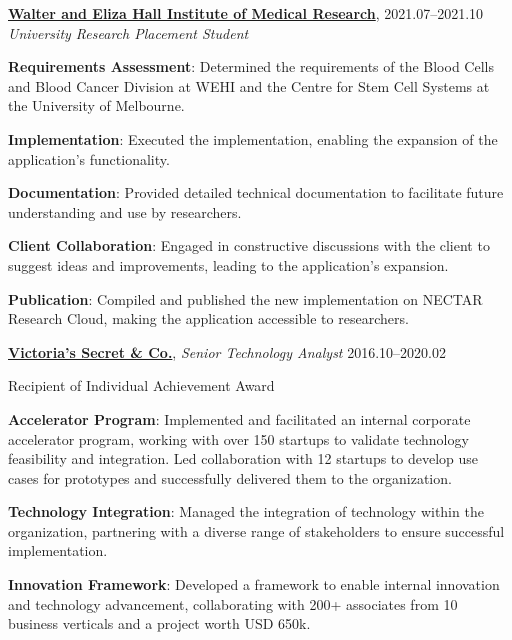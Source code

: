 \documentclass[11pt,article,oneside]{memoir}
\begin{document}
\ind \textbf{\href{https://www.wehi.edu.au/}{Walter and Eliza Hall Institute of Medical Research}}, \hfill 2021.07--2021.10
\ind \emph{University Research Placement Student}

\ind \hspace{0.35in} \textbf{Requirements Assessment}: Determined the requirements of the Blood Cells and Blood Cancer Division at WEHI and the Centre for Stem Cell Systems at the University of Melbourne.

\ind \hspace{0.35in} \textbf{Implementation}: Executed the implementation, enabling the expansion of the application's functionality.

\ind \hspace{0.35in} \textbf{Documentation}: Provided detailed technical documentation to facilitate future understanding and use by researchers.

\ind \hspace{0.35in} \textbf{Client Collaboration}: Engaged in constructive discussions with the client to suggest ideas and improvements, leading to the application's expansion.

\ind \hspace{0.35in} \textbf{Publication}: Compiled and published the new implementation on NECTAR Research Cloud, making the application accessible to researchers.

\bigskip

\ind \textbf{\href{https://www.victoriassecretandco.com/}{Victoria's Secret \& Co.}}, \emph{Senior Technology Analyst} \hfill 2016.10--2020.02

\ind \hspace{0.35in} Recipient of Individual Achievement Award

\ind \hspace{0.35in} \textbf{Accelerator Program}: Implemented and facilitated an internal corporate accelerator program, working with over 150 startups to validate technology feasibility and integration. Led collaboration with 12 startups to develop use cases for prototypes and successfully delivered them to the organization.

\ind \hspace{0.35in} \textbf{Technology Integration}: Managed the integration of technology within the organization, partnering with a diverse range of stakeholders to ensure successful implementation.

\ind \hspace{0.35in} \textbf{Innovation Framework}: Developed a framework to enable internal innovation and technology advancement, collaborating with 200+ associates from 10 business verticals and a project worth USD 650k.
\end{document}
